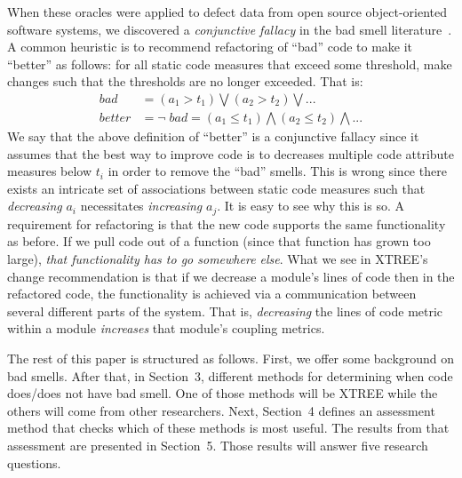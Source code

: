 \documentclass[twocolumn,5p]{elsarticle}
\theoremstyle{break}
\begin{document}
When these oracles were applied to defect data from
open source object-oriented software systems, we discovered a {\em conjunctive fallacy}
in the bad smell literature~\cite{erni96,bender99,Shatnawi10,Alves2010,hermans15}.
A common heuristic is to recommend refactoring of ``bad'' code
to make it ``better''   as follows: for all static code measures that exceed some threshold, make changes such that the thresholds are no longer exceeded. That is:
\begin{equation}\label{eq:df}
\scriptstyle
\begin{array}{rl}
\mathit{bad} & = \left(a_1 > t_1 \right) \bigvee \left(a_2 > t_2\right) \bigvee    ... \\
\mathit{better} & = \neg\;\mathit{bad} = \left(a_1 \le t_1 \right) \bigwedge \left(a_2 \le t_2\right)  \bigwedge  ...
\end{array}
\end{equation}
We say that the above definition of ``better'' is a conjunctive fallacy
since it assumes that the best way to improve code is to decreases multiple code attribute measures below $t_i$ in order
to remove the ``bad'' smells. This is wrong since 
there exists an intricate set of associations between static code measures
such that {\em decreasing}  $a_i$ necessitates {\em increasing} $a_j$.
It is easy to see why this is so.
A requirement for  refactoring is that the new code supports the same functionality
as before. If we pull code out of a function (since that function has grown too
large), {\em that functionality has to go somewhere else}. What we see in XTREE's change
recommendation is that if we decrease a module's lines of code  then in the refactored
code, the functionality is achieved via a communication between several different parts
of the system. That is, {\em decreasing} the lines of code metric within a module {\em increases}
that module's coupling metrics.


 
  
  
  The rest of this paper is structured as follows. First, we offer some background on bad smells. After that,
  in Section~3, 
  different methods for determining when code does/does not have bad smell. One of those methods
  will be XTREE while the others will come from other researchers. Next,    Section~4
  defines an assessment method that checks which of these methods is most useful. The results from that assessment 
  are presented in Section~5. Those results will answer five research questions.
\end{document}
